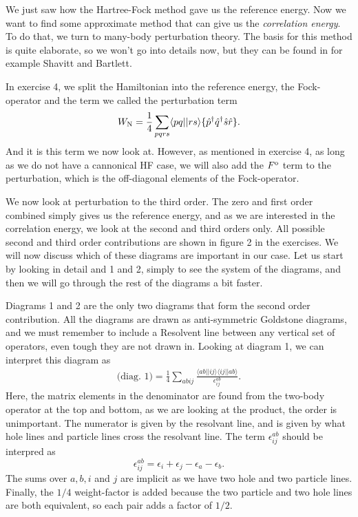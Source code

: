 \documentclass[a4paper, 11pt, notitlepage, english]{article}
\newcommand{\brakket}[2]{\langle #1 || #2 \rangle}
\newcommand{\op}[1]{\hat{#1}}
\newcommand{\eps}{\epsilon}
\begin{document}
We just saw how the Hartree-Fock method gave us the reference energy. Now we want to find some approximate method that can give us the \emph{correlation energy}. To do that, we turn to many-body perturbation theory. The basis for this method is quite elaborate, so we won't go into details now, but they can be found in for example Shavitt and Bartlett.

In exercise 4, we split the Hamiltonian into the reference energy, the Fock-operator and the term we called the perturbation term
$$W_{\rm N} = \frac{1}{4}\sum_{pqrs} \brakket{pq}{rs} \{\op{p}^\dagger\op{q}^\dagger\op{s}\op{r}\}.$$
And it is this term we now look at. However, as mentioned in exercise 4, as long as we do not have a cannonical HF case, we will also add the $F^{\rm o}$ term to the perturbation, which is the off-diagonal elements of the Fock-operator.

We now look at perturbation to the third order. The zero and first order combined simply gives us the reference energy, and as we are interested in the correlation energy, we look at the second and third orders only. All possible second and third order contributions are shown in figure 2 in the exercises. We will now discuss which of these diagrams are important in our case. Let us start by looking in detail and 1 and 2, simply to see the system of the diagrams, and then we will go through the rest of the diagrams a bit faster.

Diagrams 1 and 2 are the only two diagrams that form the second order contribution. All the diagrams are drawn as anti-symmetric Goldstone diagrams, and we must remember to include a Resolvent line between any vertical set of operators, even tough they are not drawn in. Looking at diagram 1, we can interpret this diagram as
\begin{align*}
  \mbox{(diag.\ 1)} = \frac{1}{4}\sum_{abij}\frac{\brakket{ab}{ij}\brakket{ij}{ab}}{\eps_{ij}^{ab}}.
\end{align*}
Here, the matrix elements in the denominator are found from the two-body operator at the top and bottom, as we are looking at the product, the order is unimportant. The numerator is given by the resolvant line, and is given by what hole lines and particle lines cross the resolvant line. The term $\eps_{ij}^{ab}$ should be interpred as
$$\eps_{ij}^{ab} = \eps_i + \eps_j - \eps_a - \eps_b.$$
The sums over $a,b,i$ and $j$ are implicit as we have two hole and two particle lines. Finally, the $1/4$ weight-factor is added because the two particle and two hole lines are both equivalent, so each pair adds a factor of $1/2$.
\end{document}
